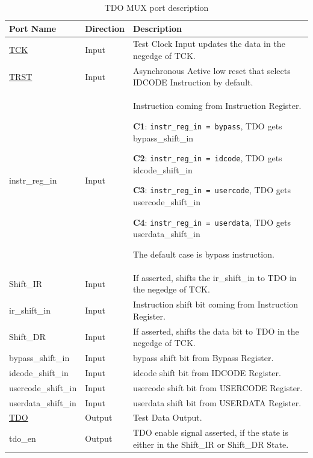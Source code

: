 \begin{longtable}{l l p{9.5cm}}
    \caption{TDO MUX port description}
    \label{tab:itdo-mux-ports}\\
    \hline
         \textbf{Port Name} & \textbf{Direction} & \textbf{Description}\\ \hline \hline
         \hyperref[subsec:tck]{TCK} & Input & Test Clock Input updates the data in the negedge of TCK.\\ \hline
        \hyperref[subsec:trst]{TRST} & Input & Asynchronous Active low reset that selects IDCODE Instruction by default. \\ \hline
        instr\_reg\_in & Input & Instruction coming from Instruction Register.
        
        \textbf{C1}: \texttt{instr\_reg\_in = bypass}, TDO gets bypass\_shift\_in
        
        \textbf{C2}: \texttt{instr\_reg\_in = idcode}, TDO gets idcode\_shift\_in
        
        \textbf{C3}: \texttt{instr\_reg\_in = usercode}, TDO gets usercode\_shift\_in
        
        \textbf{C4}: \texttt{instr\_reg\_in = userdata}, TDO gets userdata\_shift\_in
        
        The default case is bypass instruction. \\ \hline
        Shift\_IR & Input & If asserted, shifts the ir\_shift\_in to TDO in the negedge of TCK. \\ \hline
        ir\_shift\_in & Input & Instruction shift bit coming from Instruction Register.\\ \hline
        Shift\_DR & Input & If asserted, shifts the data bit to TDO in the negedge of TCK.\\ \hline
        bypass\_shift\_in & Input & bypass shift bit from Bypass Register. \\ \hline
        idcode\_shift\_in & Input & idcode shift bit from IDCODE Register.\\ \hline
        usercode\_shift\_in & Input & usercode shift bit from USERCODE Register.\\ \hline
        userdata\_shift\_in & Input & userdata shift bit from USERDATA Register. \\ \hline
        \hyperref[subsec:tdo]{TDO} & Output & Test Data Output.\\ \hline
        tdo\_en & Output & TDO enable signal asserted, if the state is either in the Shift\_IR or Shift\_DR State.\\ \hline
\end{longtable}